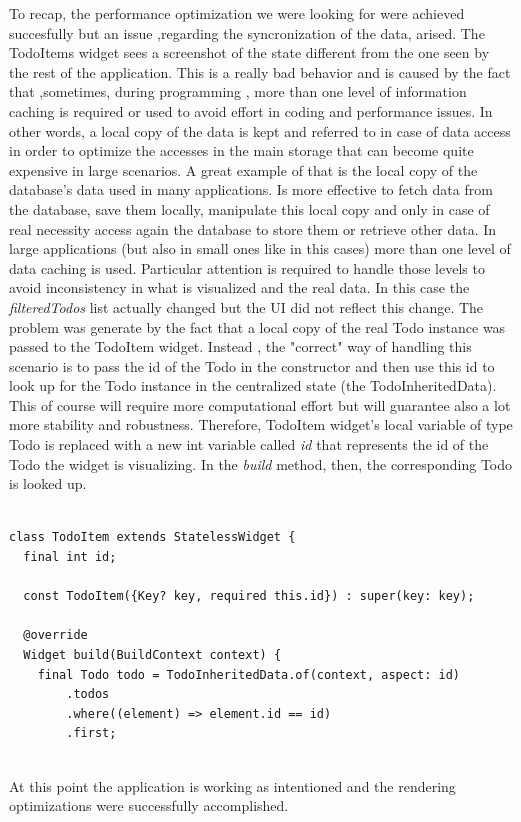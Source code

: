 To recap, the performance optimization we were looking for were achieved succesfully but an issue ,regarding the syncronization of the data, arised. The TodoItems widget sees a screenshot of the state different from the one seen by the rest of the application. This is a really bad behavior and is caused by the fact that ,sometimes, during programming , more than one level of information caching is required or used to avoid effort in coding and performance issues. In other words, a local copy of the data is kept and referred to in case of data access in order to optimize the accesses in the main storage that can become quite expensive in large scenarios. A great example of that is the local copy of the database’s data used in many applications. Is more effective to fetch data from the database, save them locally, manipulate this local copy and only in case of real necessity access again the database to store them or retrieve other data. In large applications (but also in small ones like in this cases) more than one level of data caching is used. Particular attention is required to handle those levels to avoid inconsistency in what is visualized and the real data. In this case the \textit{filteredTodos} list actually changed but the UI did not reflect this change. The problem was generate by the fact that a local copy of the real Todo instance was passed to the TodoItem widget. Instead , the "correct" way of handling this scenario is to pass the id of the Todo in the constructor and then use this id to look up for the Todo instance in the centralized state (the TodoInheritedData). This of course will require more computational effort but  will guarantee also a lot more stability and robustness. 
Therefore, TodoItem widget's local variable of type Todo is replaced with a new int variable called \textit{id} that represents the id of the Todo the widget is visualizing. In the \textit{build} method, then, the corresponding Todo is looked up.
\mbox{}\\
\begin{code}
\mbox{}
\label{code:2.48}
\begin{verbatim}

class TodoItem extends StatelessWidget {
  final int id;

  const TodoItem({Key? key, required this.id}) : super(key: key);

  @override
  Widget build(BuildContext context) {
    final Todo todo = TodoInheritedData.of(context, aspect: id)
        .todos
        .where((element) => element.id == id)
        .first;
\end{verbatim}
\end{code}
\mbox{}\\
At this point the application is working as intentioned and the rendering optimizations were successfully accomplished. \\


